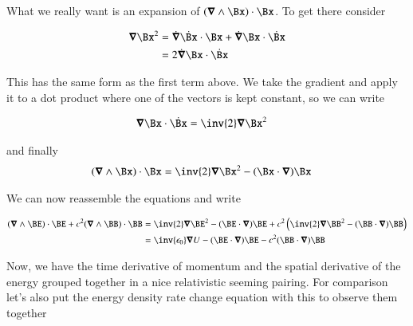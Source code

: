 %

What we really want is an expansion of $(\spacegrad \wedge \Bx) \cdot \Bx$.  To get there consider

\begin{align*}
\spacegrad \Bx^2
&= \dot{\spacegrad} \dot{\Bx} \cdot \Bx + \dot{\spacegrad} {\Bx} \cdot \dot{\Bx} \\
&= 2 \dot{\spacegrad} {\Bx} \cdot \dot{\Bx} \\
\end{align*}

This has the same form as the first term above.  We take the gradient and apply it to a dot product where one of the vectors is kept constant, so we can write

\begin{align*}
{\spacegrad} {\Bx} \cdot \dot{\Bx} &= \inv{2} \spacegrad \Bx^2
\end{align*}

and finally
\begin{align}\label{eqn:poynting_rate:wedgedot}
(\spacegrad \wedge \Bx) \cdot \Bx
&= \inv{2} \spacegrad \Bx^2 - (\Bx \cdot \spacegrad) \Bx
\end{align}

We can now reassemble the equations and write

\begin{align*}
(\spacegrad \wedge \BE) \cdot \BE + c^2 (\spacegrad \wedge \BB) \cdot \BB
&=
\inv{2} \spacegrad \BE^2 - (\BE \cdot \spacegrad) \BE
+ c^2 \left(\inv{2} \spacegrad \BB^2 - (\BB \cdot \spacegrad) \BB \right) \\
&= \inv{\epsilon_0} \spacegrad U - (\BE \cdot \spacegrad) \BE - c^2 (\BB \cdot \spacegrad) \BB \\
\end{align*}

Now, we have the time derivative of momentum and the spatial derivative of the energy grouped together in a nice
relativistic seeming pairing.  For comparison let's also put the energy density rate change equation with this
to observe them together

